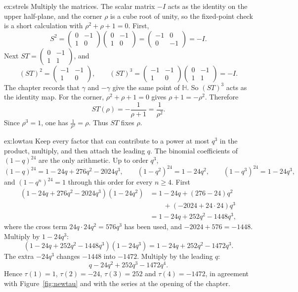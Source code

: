 \begin{solution}{ex:strels}
\idea Multiply the matrices. The scalar matrix $-I$ acts as the identity on the upper half-plane, and the corner $\rho$ is a cube root of unity, so the fixed-point check is a short calculation with $\rho^2+\rho+1=0$.
\writeup First,
\[
S^2=\begin{pmatrix}0&-1\\1&0\end{pmatrix}\begin{pmatrix}0&-1\\1&0\end{pmatrix}=\begin{pmatrix}-1&0\\0&-1\end{pmatrix}=-I.
\]
Next $ST=\begin{pmatrix}0&-1\\1&1\end{pmatrix}$, and
\[
(ST)^2=\begin{pmatrix}-1&-1\\1&0\end{pmatrix},\qquad
(ST)^3=\begin{pmatrix}-1&-1\\1&0\end{pmatrix}\begin{pmatrix}0&-1\\1&1\end{pmatrix}=-I.
\]
The chapter records that $\gamma$ and $-\gamma$ give the same point of $\mathbb H$. So $(ST)^3$ acts as the identity map.
For the corner, $\rho^2+\rho+1=0$ gives $\rho+1=-\rho^2$. Therefore
\[
ST(\rho)=-\frac1{\rho+1}=\frac1{\rho^2}.
\]
Since $\rho^3=1$, one has $\frac1{\rho^2}=\rho$. Thus $ST$ fixes $\rho$.
\end{solution}

\begin{solution}{ex:lowtau}
\idea Keep every factor that can contribute to a power at most $q^3$ in the product, multiply, and then attach the leading $q$. The binomial coefficients of $(1-q)^{24}$ are the only arithmetic.
\writeup Up to order $q^3$,
\[
(1-q)^{24}=1-24q+276q^2-2024q^3,\qquad
(1-q^2)^{24}=1-24q^2,\qquad
(1-q^3)^{24}=1-24q^3,
\]
and $(1-q^n)^{24}=1$ through this order for every $n\ge4$. First
\begin{align*}
(1-24q+276q^2-2024q^3)(1-24q^2)
&=1-24q+(276-24)q^2\\
&\qquad+(-2024+24\cdot24)q^3\\
&=1-24q+252q^2-1448q^3,
\end{align*}
where the cross term $24q\cdot24q^2=576q^3$ has been used, and $-2024+576=-1448$. Multiply by $1-24q^3$:
\[
(1-24q+252q^2-1448q^3)(1-24q^3)=1-24q+252q^2-1472q^3.
\]
The extra $-24q^3$ changes $-1448$ into $-1472$. Multiply by the leading $q$:
\[
q-24q^2+252q^3-1472q^4.
\]
Hence $\tau(1)=1$, $\tau(2)=-24$, $\tau(3)=252$ and $\tau(4)=-1472$, in agreement with Figure~\ref{fig:newtau} and with the series at the opening of the chapter.
\end{solution}

